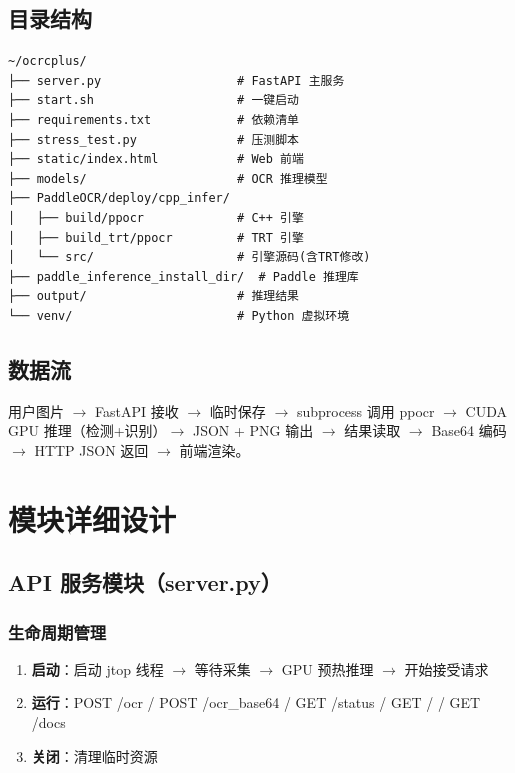 \documentclass[12pt,a4paper]{ctexart}
\begin{document}
\subsection{目录结构}
\begin{lstlisting}[caption={项目目录结构}]
~/ocrcplus/
├── server.py                   # FastAPI 主服务
├── start.sh                    # 一键启动
├── requirements.txt            # 依赖清单
├── stress_test.py              # 压测脚本
├── static/index.html           # Web 前端
├── models/                     # OCR 推理模型
├── PaddleOCR/deploy/cpp_infer/
│   ├── build/ppocr             # C++ 引擎
│   ├── build_trt/ppocr         # TRT 引擎
│   └── src/                    # 引擎源码(含TRT修改)
├── paddle_inference_install_dir/  # Paddle 推理库
├── output/                     # 推理结果
└── venv/                       # Python 虚拟环境
\end{lstlisting}

\subsection{数据流}
用户图片 $\rightarrow$ FastAPI 接收 $\rightarrow$ 临时保存 $\rightarrow$ subprocess 调用 ppocr $\rightarrow$ CUDA GPU 推理（检测+识别）$\rightarrow$ JSON + PNG 输出 $\rightarrow$ 结果读取 $\rightarrow$ Base64 编码 $\rightarrow$ HTTP JSON 返回 $\rightarrow$ 前端渲染。

\section{模块详细设计}

\subsection{API 服务模块（server.py）}

\subsubsection{生命周期管理}
\begin{enumerate}
    \item \textbf{启动}：启动 jtop 线程 $\rightarrow$ 等待采集 $\rightarrow$ GPU 预热推理 $\rightarrow$ 开始接受请求
    \item \textbf{运行}：POST /ocr / POST /ocr\_base64 / GET /status / GET / / GET /docs
    \item \textbf{关闭}：清理临时资源
\end{enumerate}
\end{document}

